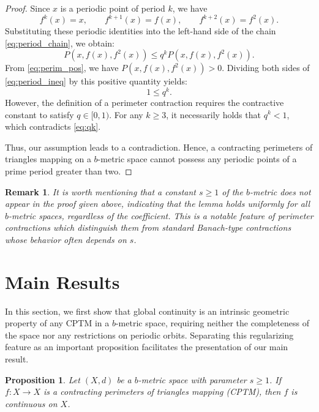 \documentclass[a4paper,12pt,oneside]{article}
\newtheorem{proposition}[theorem]{Proposition}
\newtheorem{remark}[theorem]{Remark}
\numberwithin{equation}{section}
\begin{document}
\begin{proof}
Since $x$ is a periodic point of period $k$, we have
\[
f^{k}(x) = x,\qquad f^{k + 1}(x) = f(x),\qquad f^{k + 2}(x) = f^{2}(x).
\]
Substituting these periodic identities into the left-hand side of the chain \eqref{eq:period_chain}, we obtain:
\begin{equation}
P(x,f(x),f^{2}(x))\leq q^{k}P(x,f(x),f^{2}(x)).
\label{eq:period_ineq}
\end{equation}
From \eqref{eq:perim_pos}, we have $P(x,f(x),f^{2}(x)) > 0$. Dividing both sides of \eqref{eq:period_ineq} by this positive quantity yields:
\begin{equation}
1\leq q^{k}.
\label{eq:qk}
\end{equation}
However, the definition of a perimeter contraction requires the contractive constant to satisfy $q\in [0,1)$. For any $k\geq 3$, it necessarily holds that $q^{k}<1$, which contradicts \eqref{eq:qk}.

Thus, our assumption leads to a contradiction. Hence, a contracting perimeters of triangles mapping on a $b$-metric space cannot possess any periodic points of a prime period greater than two.
\end{proof}

\begin{remark}
It is worth mentioning that a constant $s\geq 1$ of the $b$-metric does not appear in the proof given above, indicating that the lemma holds uniformly for all $b$-metric spaces, regardless of the coefficient. This is a notable feature of perimeter contractions which distinguish them  from standard Banach-type contractions whose behavior often depends on $s$.
\end{remark}

\section{Main Results}

In this section, we first show that global continuity is an intrinsic geometric property of any CPTM in a $b$-metric space, requiring neither the completeness of the space nor any restrictions on periodic orbits. Separating this regularizing feature as an important proposition facilitates the presentation of our main result.

\begin{proposition}
\label{prop:continuity}
Let $(X,d)$ be a $b$-metric space with parameter $s\geq 1$. If $f:X\to X$ is a contracting perimeters of triangles mapping (CPTM), then $f$ is continuous on $X$.
\end{proposition}
\end{document}

